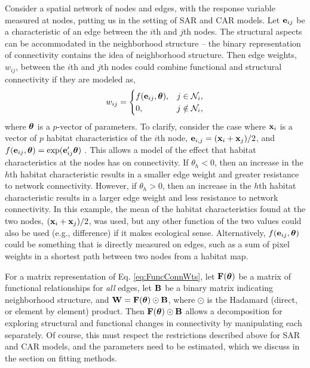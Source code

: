 \documentclass[11pt, titlepage]{article}\usepackage[]{graphicx}\usepackage[]{color}
\begin{document}
\begin{spacing}{1.9}
\begin{flushleft}
Consider a spatial network of nodes and edges, with the response variable measured at nodes, putting us in the setting of SAR and CAR models.  Let $\mathbf{e}_{ij}$ be a characteristic of an edge between the $i$th and $j$th nodes. The structural aspects can be accommodated in the neighborhood structure -- the binary representation of connectivity contains the idea of neighborhood structure. Then edge weights, $w_{ij}$, between the $i$th and $j$th nodes could combine functional and structural connectivity if they are modeled as,
\begin{equation} \label{eq:FuncConnWts}
   w_{ij}= \begin{cases}
     f(\mathbf{e}_{ij}, \mbox{\boldmath $\theta$}), & j \in \mathcal{N}_i, \\
            0, & j \notin \mathcal{N}_i, \\
    \end{cases}
\end{equation}
where $\mbox{\boldmath $\theta$}$ is a $p$-vector of parameters.  To clarify, consider the case where $\mathbf{x}_i$ is a vector of $p$ habitat characteristics of the $i$th node, $\mathbf{e}_{i,j} = (\mathbf{x}_i +\mathbf{x}_j)/2$, and $f(\mathbf{e}_{ij},\mbox{\boldmath $\theta$}) = \exp(\mathbf{e}^{\prime}_{ij}\mbox{\boldmath $\theta$})$ \citep{Hank:Hoot:circ:2013}. This allows a model of the effect that habitat characteristics at the nodes has on connectivity. If $\theta_h < 0$, then an increase in the $h$th habitat characteristic results in a smaller edge weight and greater resistance to network connectivity. However, if $\theta_h > 0$, then an increase in the $h$th habitat characteristic results in a larger edge weight and less resistance to network connectivity. In this example, the mean of the habitat characteristics found at the two nodes, $(\mathbf{x}_i +\mathbf{x}_j)/2$, was used, but any other function of the two values could also be used (e.g., difference) if it makes ecological sense.  Alternatively, $f(\mathbf{e}_{ij},\mbox{\boldmath $\theta$})$ could be something that is directly measured on edges, such as a sum of pixel weights in a shortest path between two nodes from a habitat map.   

For a matrix representation of Eq. \ref{eq:FuncConnWts}, let $\mathbf{F}(\mbox{\boldmath $\theta$})$ be a matrix of functional relationships for \textit{all} edges, let $\mathbf{B}$ be a binary matrix indicating neighborhood structure, and $\mathbf{W} = \mathbf{F}(\mbox{\boldmath $\theta$}) \odot \mathbf{B}$, where $\odot$ is the Hadamard (direct, or element by element) product. Then $\mathbf{F}(\mbox{\boldmath $\theta$}) \odot \mathbf{B}$ allows a decomposition for exploring structural and functional changes in connectivity by manipulating each separately. Of course, this must respect the restrictions described above for SAR and CAR models, and the parameters need to be estimated, which we discuss in the section on fitting methods.


\end{flushleft}
\end{spacing}
\end{document}
